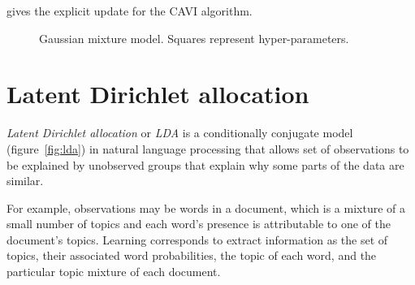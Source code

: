 \cite{bishop2006pattern} gives the explicit update for the CAVI algorithm.

\begin{figure}[h!]
  \centering
  \caption{Gaussian mixture model. Squares represent hyper-parameters.}
  \label{fig:gaussian_mixture}
\end{figure}


\section{Latent Dirichlet allocation}

\emph{Latent Dirichlet allocation} or \emph{LDA} is a conditionally conjugate model (figure~\ref{fig:lda}) in natural language processing that allows set of observations to be explained by unobserved groups that explain why some parts of the data are similar.

For example, observations may be words in a document, which is a mixture of a small number of topics and each word's presence is attributable to one of the document's topics. Learning corresponds to extract information as the set of topics, their associated word probabilities, the topic of each word, and the particular topic mixture of each document.

